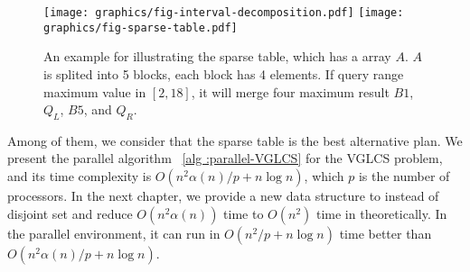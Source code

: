 \begin{figure*}[!thb]
  \centering
  \texttt{[image: graphics/fig-interval-decomposition.pdf]}
  \texttt{[image: graphics/fig-sparse-table.pdf]}

  \caption{   An example for illustrating the sparse table, which has
a array $A$. $A$ is splited into 5 blocks, each block has 4 elements.
If query range maximum value in $[2, 18]$, it will merge four maximum
result $B1$, $Q_L$, $B5$, and $Q_R$.   }

  \label{fig:interval-decomposition}
\end{figure*}

Among of them, we consider that the sparse table is the best
alternative plan.  We present the parallel algorithm ~\ref{alg
:parallel-VGLCS} for the VGLCS problem, and its time complexity is
$O(n^2 \alpha(n) / p + n \log n)$, which $p$ is the number of
processors. In the next chapter, we provide a new data structure to
instead of disjoint set and reduce $O(n^2 \alpha(n))$ time to $O(n^2)$
time in theoretically.  In the parallel environment, it can run in
$O(n^2 /p + n \log n)$ time better than $O(n^2 \alpha(n)/p + n \log
n)$.

